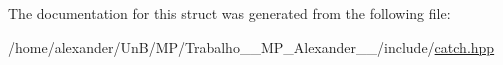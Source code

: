 The documentation for this struct was generated from the following file\-:\begin{DoxyCompactItemize}
\item 
/home/alexander/\-Un\-B/\-M\-P/\-Trabalho\-\_\-\_\-\-M\-P\-\_\-\-Alexander\-\_\-\_/include/\hyperlink{catch_8hpp}{catch.\-hpp}\end{DoxyCompactItemize}
